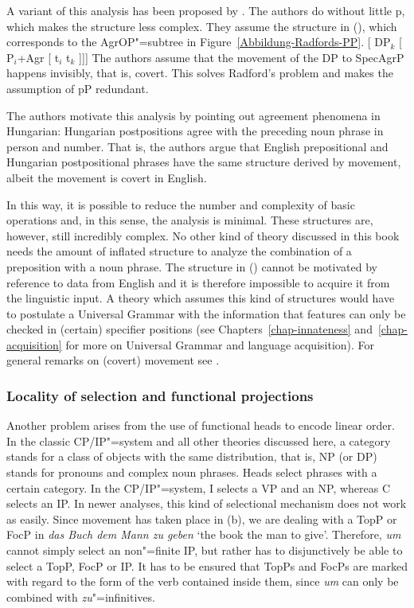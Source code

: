 A variant of this analysis has been proposed by \citet*[]{HNG2005a}. The authors do without little p, which makes the structure
less complex. They assume the structure in (), which corresponds to the AgrOP"=subtree in Figure~\ref{Abbildung-Radfords-PP}.
\ea
{}[ DP$_k$ [ P$_i$+Agr [ t$_i$ t$_k$ ]]]
\z
The authors assume that the movement of the DP to SpecAgrP happens invisibly, that is,
covert. This solves Radford's problem and makes the assumption of pP redundant. 

The authors motivate this analysis by pointing out agreement phenomena in Hungarian: Hungarian
postpositions agree with the preceding noun phrase in person and number. That is, the authors argue that English prepositional
and Hungarian postpositional phrases have the same structure derived by movement, albeit the
movement is covert in English.

In this way, it is possible to reduce the number and complexity of basic operations and, in this sense, the analysis is minimal. These structures
are, however, still incredibly complex. No other kind of theory discussed in this book needs the amount of inflated structure to analyze the combination
of a preposition with a noun phrase. The structure in () cannot be motivated by reference to
data from English and it is therefore impossible to acquire it from the linguistic input. A theory
which assumes this kind of structures would have to postulate a Universal Grammar with
the information that features can only be checked in (certain) specifier positions (see Chapters~\ref{chap-innateness} 
and~\ref{chap-acquisition} for more on Universal Grammar and language acquisition). For general
remarks on (covert) movement see .

\subsubsection{Locality of selection and functional projections}

Another problem arises from the use of functional heads to encode linear order. In the classic
CP/IP"=system and all other theories discussed here, a category stands for a class of objects with
the same distribution, that is, NP (or DP) stands for pronouns and complex noun phrases. Heads
select phrases with a certain category. In the CP/IP"=system, I selects a VP and an NP, whereas C
selects an IP. In newer analyses, this kind of selectional mechanism does not work as easily. Since
movement has taken place in (b), we are dealing with a TopP or FocP in \emph{das Buch dem
  Mann zu geben} `the book the man to give'.  Therefore, \emph{um} cannot simply select an
non"=finite IP, but rather has to disjunctively be able to select a TopP, FocP or IP. It has to be
ensured that TopPs and FocPs are marked with regard to the form of the verb contained inside them,
since \emph{um} can only be combined with \emph{zu}"=infinitives.

